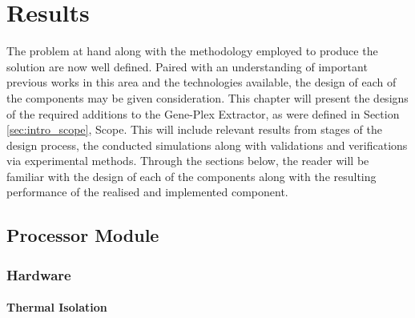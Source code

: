 \chapter{Results}
\label{cha:results}
%
%
%

The problem at hand along with the methodology employed to produce the solution are now well defined. Paired with an understanding of important previous works in this area and the technologies available, the design of each of the components may be given consideration. This chapter will present the designs of the required additions to the Gene-Plex Extractor, as were defined in Section \ref{sec:intro_scope}, Scope. This will include relevant results from stages of the design process, the conducted simulations along with validations and verifications via experimental methods. Through the sections below, the reader will be familiar with the design of each of the components along with the resulting performance of the realised and implemented component.\\

\section{Processor Module}

\subsection{Hardware}

\subsubsection{Thermal Isolation}

